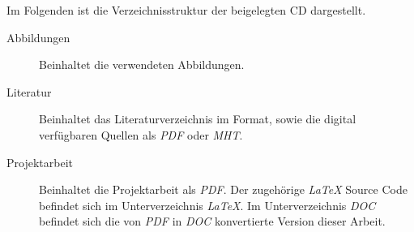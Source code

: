 \label{cha:Beigaben}

Im Folgenden ist die Verzeichnisstruktur der beigelegten CD dargestellt.
 
\begin{description}
	\item[Abbildungen]
		Beinhaltet die verwendeten Abbildungen.
	\item[Literatur]
		Beinhaltet das Literaturverzeichnis im \textit{\BibTeX{}} Format, sowie die digital verfügbaren Quellen als \textit{PDF} oder \textit{MHT}.
	\item[Projektarbeit]
		Beinhaltet die Projektarbeit als \textit{PDF}.
		Der zugehörige \emph{\LaTeX{}} Source Code befindet sich im Unterverzeichnis \textit{LaTeX}.
		Im Unterverzeichnis \textit{DOC} befindet sich die von \textit{PDF} in \textit{DOC} konvertierte Version dieser Arbeit.
\end{description}